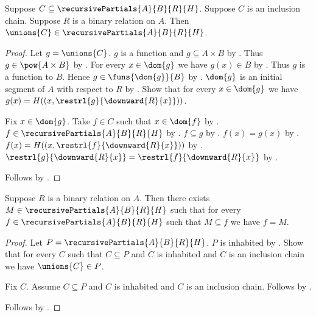 \begin{proposition}\label{recursive_partial_chain_union}
    Suppose $C\subseteq\recursivePartials{A}{B}{R}{H}$.
    Suppose $C$ is an inclusion chain.
    Suppose $R$ is a binary relation on $A$.
    Then $\unions{C}\in\recursivePartials{A}{B}{R}{H}$.
\end{proposition}
\begin{proof}
    Let $g=\unions{C}$.
    $g$ is a function and $g\subseteq A\times B$
        by .
    Thus $g\in\pow{A\times B}$ by .
    For every $x\in\dom{g}$ we have $g(x)\in B$
        by .
    Thus $g$ is a function to $B$.
    Hence $g\in\funs{\dom{g}}{B}$ by .
    $\dom{g}$ is an initial segment of $A$ with respect to $R$
        by .
    Show that for every $x\in\dom{g}$ we have
        $g(x)=H((x,\restrl{g}{\downward{R}{x}}))$.
    \begin{subproof}
        Fix $x\in\dom{g}$.
        Take $f\in C$ such that $x\in\dom{f}$
            by .
        $f\in\recursivePartials{A}{B}{R}{H}$ by .
        $f\subseteq g$ by .
        $f(x)=g(x)$ by .
        $f(x)=H((x,\restrl{f}{\downward{R}{x}}))$
            by .
        $\restrl{g}{\downward{R}{x}}=\restrl{f}{\downward{R}{x}}$
            by .
    \end{subproof}
    Follows by .
\end{proof}

\begin{theorem}\label{maximal_recursive_partial}
    Suppose $R$ is a binary relation on $A$.
    Then there exists $M\in\recursivePartials{A}{B}{R}{H}$ such that
        for every $f\in\recursivePartials{A}{B}{R}{H}$ such that
            $M\subseteq f$ we have $f=M$.
\end{theorem}
\begin{proof}
    Let $P=\recursivePartials{A}{B}{R}{H}$.
    $P$ is inhabited by .
    Show that for every $C$ such that $C\subseteq P$ and $C$ is inhabited
        and $C$ is an inclusion chain we have $\unions{C}\in P$.
    \begin{subproof}
        Fix $C$.
        Assume $C\subseteq P$ and $C$ is inhabited and $C$ is an inclusion chain.
        Follows by .
    \end{subproof}
    Follows by .
\end{proof}

